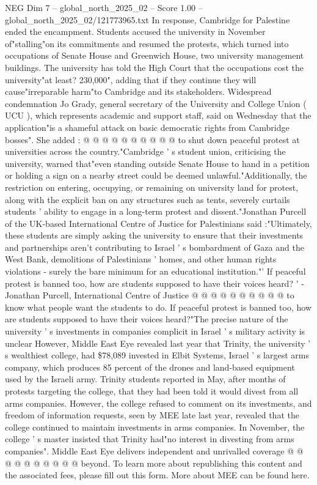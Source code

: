 \begin{textsample}{NEG Dim 7 – global\_north\_2025\_02 – Score 1.00 – global\_north\_2025\_02/121773965.txt}
In response, Cambridge for Palestine ended the encampment.
Students accused the university in November of"stalling"on its commitments and resumed the protests, which turned into occupations of Senate House and Greenwich House, two university management buildings.
The university has told the High Court that the occupations cost the university"at least? 230,000", adding that if they continue they will cause"irreparable harm"to Cambridge and its stakeholders.
Widespread condemnation Jo Grady, general secretary of the University and College Union ( UCU ), which represents academic and support staff, said on Wednesday that the application"is a shameful attack on basic democratic rights from Cambridge bosses".
She added : @ @ @ @ @ @ @ @ @ @ to shut down peaceful protest at universities across the country."Cambridge ' s student union, criticising the university, warned that"even standing outside Senate House to hand in a petition or holding a sign on a nearby street could be deemed unlawful."Additionally, the restriction on entering, occupying, or remaining on university land for protest, along with the explicit ban on any structures such as tents, severely curtails students ' ability to engage in a long-term protest and dissent."Jonathan Purcell of the UK-based International Centre of Justice for Palestinians said :"Ultimately, these students are simply asking the university to ensure that their investments and partnerships aren't contributing to Israel ' s bombardment of Gaza and the West Bank, demolitions of Palestinians ' homes, and other human rights violations - surely the bare minimum for an educational institution."' If peaceful protest is banned too, how are students supposed to have their voices heard? ' - Jonathan Purcell, International Centre of Justice @ @ @ @ @ @ @ @ @ @ to know what people want the students to do.
If peaceful protest is banned too, how are students supposed to have their voices heard?"The precise nature of the university ' s investments in companies complicit in Israel ' s military activity is unclear However, Middle East Eye revealed last year that Trinity, the university ' s wealthiest college, had \$78,089 invested in Elbit Systems, Israel ' s largest arms company, which produces 85 percent of the drones and land-based equipment used by the Israeli army.
Trinity students reported in May, after months of protests targeting the college, that they had been told it would divest from all arms companies.
However, the college refused to comment on its investments, and freedom of information requests, seen by MEE late last year, revealed that the college continued to maintain investments in arms companies.
In November, the college ' s master insisted that Trinity had"no interest in divesting from arms companies".
Middle East Eye delivers independent and unrivalled coverage @ @ @ @ @ @ @ @ @ @ beyond.
To learn more about republishing this content and the associated fees, please fill out this form.
More about MEE can be found here.

\end{textsample}
